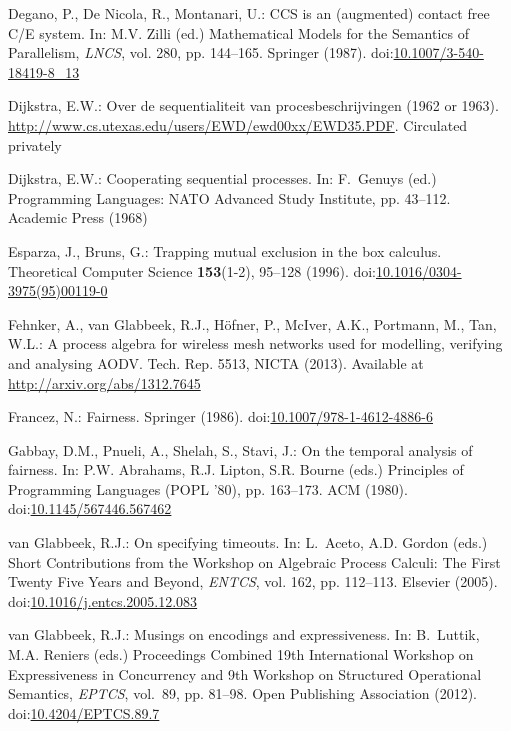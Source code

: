 \documentclass[smallcondensed]{svjour3}
\providecommand{\urlalt}[2]{\href{#1}{#2}}
\providecommand{\doi}[1]{doi:\urlalt{http://dx.doi.org/#1}{#1}}
\begin{document}
\begin{thebibliography}{10}
Degano, P., {De Nicola}, R., Montanari, U.: {CCS} is an (augmented) contact
  free {C/E} system.
\newblock In: M.V. Zilli (ed.) Mathematical Models for the Semantics of
  Parallelism, \emph{\rm LNCS}, vol. 280, pp. 144--165. Springer (1987).
\newblock \doi{10.1007/3-540-18419-8\_13}

Dijkstra, E.W.: Over de sequentialiteit van procesbeschrijvingen (1962 or
  1963).
\newblock \urlprefix\url{http://www.cs.utexas.edu/users/EWD/ewd00xx/EWD35.PDF}.
\newblock Circulated privately

Dijkstra, E.W.: Cooperating sequential processes.
\newblock In: F.~Genuys (ed.) Programming Languages: NATO Advanced Study
  Institute, pp. 43--112. Academic Press (1968)

Esparza, J., Bruns, G.: Trapping mutual exclusion in the box calculus.
\newblock Theoretical Computer Science \textbf{153}(1-2), 95--128 (1996).
\newblock \doi{10.1016/0304-3975(95)00119-0}

Fehnker, A., van Glabbeek, R.J., H{\"o}fner, P., McIver, A.K., Portmann, M.,
  Tan, W.L.: A process algebra for wireless mesh networks used for modelling,
  verifying and analysing {AODV}.
\newblock Tech. Rep. 5513, NICTA (2013).
\newblock Available at \url{http://arxiv.org/abs/1312.7645}

Francez, N.: Fairness.
\newblock Springer (1986).
\newblock \doi{10.1007/978-1-4612-4886-6}

Gabbay, D.M., Pnueli, A., Shelah, S., Stavi, J.: On the temporal analysis of
  fairness.
\newblock In: P.W. Abrahams, R.J. Lipton, S.R. Bourne (eds.) Principles of
  Programming Languages {(POPL '80)}, pp. 163--173. ACM (1980).
\newblock \doi{10.1145/567446.567462}

van Glabbeek, R.J.: On specifying timeouts.
\newblock In: L.~Aceto, A.D. Gordon (eds.) {\rm Short Contributions from the
  Workshop on} Algebraic Process Calculi: The First Twenty Five Years and
  Beyond, \emph{\rm ENTCS}, vol. 162, pp. 112--113. Elsevier (2005).
\newblock \doi{10.1016/j.entcs.2005.12.083}

van Glabbeek, R.J.: Musings on encodings and expressiveness.
\newblock In: B.~Luttik, M.A. Reniers (eds.) {\rm Proceedings Combined 19th
  International Workshop on} Expressiveness in Concurrency {\rm and 9th
  Workshop on} Structured Operational Semantics, \emph{\rm EPTCS}, vol.~89, pp.
  81--98. Open Publishing Association (2012).
\newblock \doi{10.4204/EPTCS.89.7}


\end{thebibliography}
\end{document}
